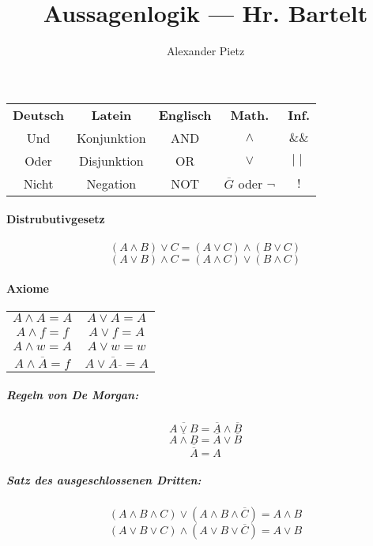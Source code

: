 \documentclass[a4paper,10pt]{article}
\title{Aussagenlogik --- Hr. Bartelt}
\author{Alexander Pietz}
\begin{document}
\maketitle

\begin{center}
\begin{tabular}[c]{ccccc}
\textbf{Deutsch} & \textbf{Latein} & \textbf{Englisch} & \textbf{Math.} & \textbf{Inf.}\\
Und & Konjunktion & AND & $\wedge$ & $ \& \& $\\
Oder & Disjunktion & OR & $\vee$ & $\mid\mid$\\
Nicht & Negation & NOT & $\overline{G}$ oder $\neg$ & $!$
\end{tabular}
\end{center}

\paragraph{Distrubutivgesetz}
  \[(A \wedge B) \vee C = (A \vee C) \wedge (B \vee C) \]
  \[(A \vee B) \wedge C = (A \wedge C) \vee (B \wedge C) \]

\paragraph{Axiome}
\begin{center}
\begin{tabular}{cc}
$A \wedge A = A$ & $A \vee A = A$\\
$A \wedge f = f$ & $A \vee f = A$\\
$A \wedge w = A$ & $A \vee w = w$\\
$A \wedge \overline{A} = f$ & $A \vee \overline{A}\overline{} = A$
\end{tabular}
\subparagraph{Regeln von De Morgan:}
\[\overline{A \vee B} = \overline{A} \wedge \overline{B}\]
\[\overline{A \wedge B} = \overline{A} \vee \overline{B}\]
\[\overline{\overline{A}} = A\]

\subparagraph{Satz des ausgeschlossenen Dritten:}
\[ (A \wedge B \wedge C) \vee (A \wedge B \wedge \overline{C}) = A \wedge B \]
\[ (A \vee B \vee C) \wedge (A \vee B \vee \overline{C}) = A \vee B \]
\end{center}
\end{document}
